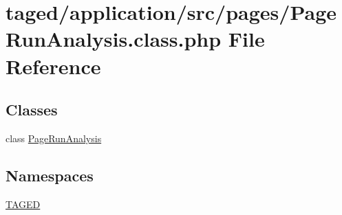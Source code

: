 \hypertarget{_page_run_analysis_8class_8php}{}\section{taged/application/src/pages/\+Page\+Run\+Analysis.class.\+php File Reference}
\label{_page_run_analysis_8class_8php}
\subsection*{Classes}
\begin{DoxyCompactItemize}
\item 
class \hyperlink{class_page_run_analysis}{Page\+Run\+Analysis}
\end{DoxyCompactItemize}
\subsection*{Namespaces}
\begin{DoxyCompactItemize}
\item 
 \hyperlink{namespace_t_a_g_e_d}{T\+A\+G\+ED}
\end{DoxyCompactItemize}
